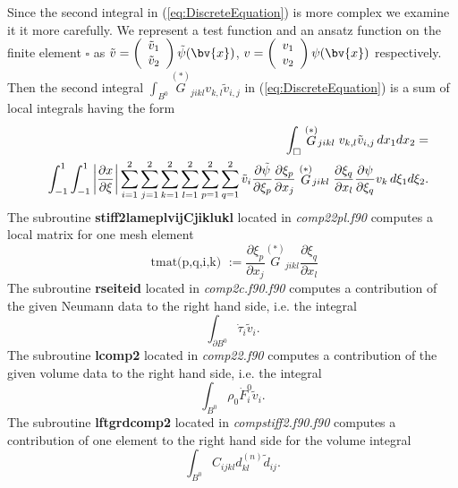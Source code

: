 Since the second integral in (\ref{eq:DiscreteEquation}) is more complex we examine it it more carefully.  We represent a test function and an ansatz function on the finite element $\square$ as $\tilde{v}=\left(\begin{array}{c} \tilde{v}_1 \\ \tilde{v}_2 \end{array}\right)\tilde{\psi}(\bv{x})$,  $v=\left(\begin{array}{c} v_1 \\ v_2 \end{array}\right)\psi(\bv{x})$ respectively. Then the second integral $\int_{B^0}\stackrel{(*)}{G}_{jikl}v_{k,l}\tilde{v}_{i,j}$ in (\ref{eq:DiscreteEquation}) is a sum of local integrals having the form
\begin{eqnarray}
&&\hspace{-2cm}\int_{\square}\stackrel{(*)}{G}_{jikl}v_{k,l}\tilde{v}_{i,j}\, dx_1 dx_2=\nonumber\\
&&\int^1_{-1}\int^1_{-1} \left|\dfrac{\partial x}{\partial \xi}\right|\sum_{i=1}^{2}\sum_{j=1}^{2}\sum_{k=1}^{2}\sum_{l=1}^{2}\sum_{p=1}^{2}\sum_{q=1}^{2}\tilde{v}_i   \dfrac{\partial \tilde{\psi}}{\partial \xi_p}   \dfrac{ \partial \xi_p}{ \partial x_j}\stackrel{(*)}{G}_{jikl} \dfrac{ \partial \xi_q}{\partial  x_l}  \dfrac{\partial \psi}{\partial \xi_q}    v_k \, d\xi_1 d\xi_2.\nonumber
\end{eqnarray}
The subroutine \textbf{stiff2lameplvijCjiklukl} located in \textit{comp22pl.f90} computes a local matrix for one mesh element
\begin{equation}\nonumber
\mbox{ tmat(p,q,i,k) }:= \dfrac{ \partial \xi_p}{ \partial x_j}\stackrel{(*)}{G}_{jikl} \dfrac{ \partial \xi_q}{\partial  x_l}
\end{equation}
The subroutine  \textbf{rseiteid} located in \textit{comp2c.f90.f90}  computes a contribution of the given Neumann data to the right hand side, i.e. the integral
\begin{equation}\nonumber
 \int_{\partial B^0}\dot{\tau}_i\tilde{v}_i.
\end{equation}
The subroutine  \textbf{lcomp2} located in \textit{comp22.f90} computes a contribution of the given volume data to the right hand side, i.e. the integral
\begin{equation}\nonumber
\int_{B^0}\rho_0\dot{F}^0_i\tilde{v}_i.
\end{equation}
The subroutine  \textbf{lftgrdcomp2} located in \textit{compstiff2.f90.f90}  computes a contribution of one element to the  right hand side for the volume integral
\begin{equation}\nonumber
\int_{B^0}C_{ijkl}d^{(n)}_{kl}\tilde{d}_{ij}.
\end{equation}

